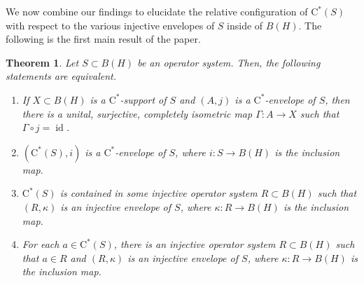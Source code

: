 \documentclass[10pt]{amsart}
\newcommand{\rC}{\mathrm{C}}
\newcommand{\id}{\operatorname{id}}
\newtheorem{theorem}[lemma]{Theorem}
\theoremstyle{definition}
\begin{document}
We now combine our findings to elucidate the relative configuration of $\rC^*(S)$ with respect to the various injective envelopes of $S$ inside of $B(H)$. The following is the first main result of the paper.



\begin{theorem}\label{T:Shtrivial}
Let $S\subset B(H)$  be an operator system. Then, the following statements are equivalent.
\begin{enumerate}[{\rm (i)}]
\item If $X\subset B(H)$ is a $\rC^*$-support of $S$ and $(A,j)$ is a $\rC^*$-envelope of $S$, then there is a unital, surjective, completely isometric map $\Gamma:A\to X$ such that $\Gamma\circ j=\id$. 
\item $(\rC^*(S),i)$ is a  $\rC^*$-envelope of $S$, where $i:S\to B(H)$ is the inclusion map.
\item $\rC^*(S)$ is contained in some injective operator system $R\subset B(H)$  such that $(R,\kappa)$ is an injective envelope of $S$, where $\kappa:R\to B(H)$ is the inclusion map.
\item For each $a\in \rC^*(S)$, there is an injective operator system $R\subset B(H)$  such that $a\in R$ and $(R,\kappa)$ is an injective envelope of $S$, where $\kappa:R\to B(H)$ is the inclusion map.
\end{enumerate}
\end{theorem}
\end{document}
